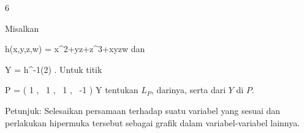 {6}
{

Misalkan

\mavergleichskettedisp
{\vergleichskette
{ h(x,y,z,w)
}
{ =} { x^2+yz+z^3+xyzw
}
{ } {
}
{ } {
}
{ } {
}
}
{}{}{}
dan

\mavergleichskette
{\vergleichskette
{ Y
}
{ = }{ h^{-1}(2)
}
{  }{
}
{    }{
}
{   }{
}
}
{}{}{.}
Untuk titik

\mavergleichskettedisp
{\vergleichskette
{ P
}
{ =} { \left(  1   , \,   1  , \,   1 , \,   -1                \right)
}
{ \in} { Y
}
{ } {
}
{ } {
}
}
{}{}{}
tentukan
$L_P$,
darinya, serta
dari $Y$ di $P$.

}
{} {Petunjuk: Selesaikan persamaan terhadap suatu variabel yang sesuai dan perlakukan hipermuka tersebut sebagai grafik dalam variabel-variabel lainnya.}

